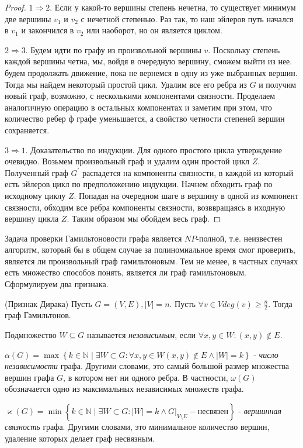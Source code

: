 \begin{proof}
	
	$1 \Rightarrow 2$.
	Если у какой-то вершины степень нечетна, то существует минимум две вершины $v_1$ и $v_2$ с нечетной степенью. Раз так, то наш эйлеров путь начался в $v_1$ и закончился в $v_2$ или наоборот, но он является циклом.
	 
	$2 \Rightarrow 3$.
	Будем идти по графу из произвольной вершины $v$. Поскольку степень каждой вершины четна, мы, войдя в очередную вершину, сможем выйти из нее. будем продолжать движение, пока не вернемся в одну из уже выбранных вершин. Тогда мы найдем некоторый простой цикл.
	Удалим все его ребра из $G$ и получим новый граф, возможно, с несколькими компонентами связности.
	Проделаем аналогичную операцию в остальных компонентах и заметим при этом, что количество ребер ф графе уменьшается, а свойство четности степеней вершин сохраняется.
	
	$3 \Rightarrow 1$.
	Доказательство по индукции. Для одного простого цикла утверждение очевидно.
	Возьмем произвольный граф и удалим один простой цикл $Z$. Полученный граф $G^{\prime}$ распадется на компоненты связности, в каждой из который есть эйлеров цикл по предположению индукции. Начнем обходить граф по исходному циклу $Z$. Попадая на очередном шаге в вершину в одной из компонент связности, обходим все ребра компоненты связности, возввращаясь в иходную вершину цикла $Z$. Таким образом мы обойдем весь граф.
\end{proof}

Задача проверки Гамильтоновости графа является $NP$-полной, т.е. неизвестен алгоритм, который бы в общем случае за полиномиальное время смог проверить, является ли произвольный граф гамильтоновым.
Тем не менее, в частных случаях есть множество способов понять, является ли граф гамильтоновым. 
Сформулируем два признака.

\begin{theorem}(Признак Дирака)
	Пусть $G = (V, E), |V| = n$. Пусть $\forall v \in V deg(v) \geqslant \frac{n}{2}$. Тогда граф Гамильтонов.
\end{theorem}

\begin{Def}
	Подмножество $W \subseteq G$ называется \emph{независимым}, если $\forall x, y \in W : (x, y) \notin E$. 
\end{Def}

\begin{Def}
	$\alpha(G) = \max \left\lbrace k \in \mathbb{N} \mid \exists W \subset G : \forall x, y \in W  (x, y) \notin E \land |W| = k  \right\rbrace$ - \emph{число независимости} графа. Другими словами, это самый большой размер множества вершин графа $ G $, в котором нет ни одного ребра.
	В частности, $\omega(G)$ обозначается одно из максимальных независимых множеств графа.
\end{Def}

\begin{Def}
	$\varkappa(G) = \min \left\lbrace k \in \mathbb{N} \mid \exists W \subset G : |W| = k \land G|_{V\setminus E} - \text{несвязен} \right\rbrace$ - \emph{вершинная связность} графа. Другими словами, это минимальное количество вершин, удаление которых делает граф несвязным.
\end{Def}
